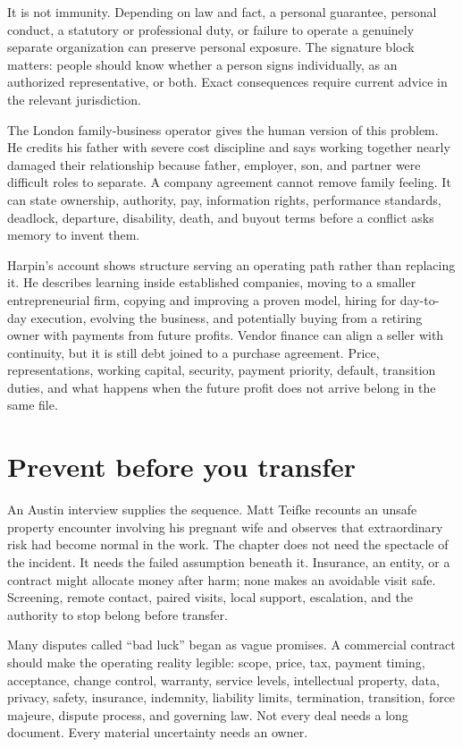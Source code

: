 It is not immunity. Depending on law and fact, a personal guarantee, personal
conduct, a statutory or professional duty, or failure to operate a genuinely
separate organization can preserve personal exposure. The signature block
matters: people should know whether a person signs individually, as an
authorized representative, or both. Exact consequences require current advice
in the relevant jurisdiction.

The London family-business operator gives the human version of this problem.
He credits his father with severe cost discipline and says working together
nearly damaged their relationship because father, employer, son, and partner
were difficult roles to separate. A company agreement cannot remove family
feeling. It can state ownership, authority, pay, information rights,
performance standards, deadlock, departure, disability, death, and buyout
terms before a conflict asks memory to invent them.

Harpin's account shows structure serving an operating path rather than
replacing it. He describes learning inside established companies, moving to a
smaller entrepreneurial firm, copying and improving a proven model, hiring for
day-to-day execution, evolving the business, and potentially buying from a
retiring owner with payments from future profits. Vendor finance can align a
seller with continuity, but it is still debt joined to a purchase agreement.
Price, representations, working capital, security, payment priority, default,
transition duties, and what happens when the future profit does not arrive
belong in the same file.

\section{Prevent before you transfer}

An Austin interview supplies the sequence. Matt Teifke recounts an unsafe
property encounter involving his pregnant wife and observes that extraordinary
risk had become normal in the work. The chapter does not need the spectacle of
the incident. It needs the failed assumption beneath it. Insurance, an entity,
or a contract might allocate money after harm; none makes an avoidable visit
safe. Screening, remote contact, paired visits, local support, escalation, and
the authority to stop belong before transfer.

Many disputes called “bad luck” began as vague promises. A commercial contract
should make the operating reality legible: scope, price, tax, payment timing,
acceptance, change control, warranty, service levels, intellectual property,
data, privacy, safety, insurance, indemnity, liability limits, termination,
transition, force majeure, dispute process, and governing law. Not every deal
needs a long document. Every material uncertainty needs an owner.

